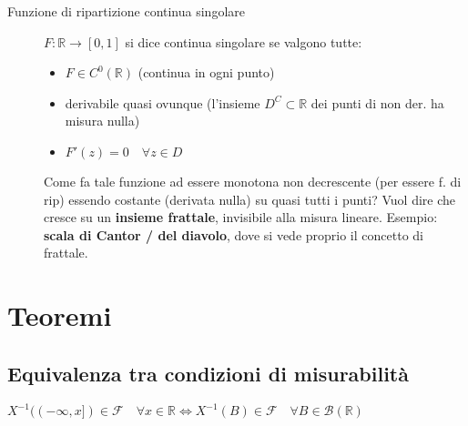 \documentclass[a4paper,10pt]{article}
\newcommand{\re}{\mathbb{R}} %
\theoremstyle{remark}
\theoremstyle{definition}
\begin{document}
\begin{description}
\item[Funzione di ripartizione continua singolare] $F:\re\to[0,1]$ si dice continua singolare se valgono tutte:
\begin{itemize}
    \item $F\in C^0(\re)$ (continua in ogni punto)
    \item derivabile quasi ovunque (l'insieme $D^C\subset \re$ dei punti di non der. ha misura nulla)
    \item $F'(z)=0 \quad \forall z\in D$
\end{itemize}
Come fa tale funzione ad essere monotona non decrescente (per essere f. di rip) essendo costante (derivata nulla) su quasi tutti i punti? Vuol dire che cresce su un \textbf{insieme frattale}, invisibile alla misura lineare. Esempio: \textbf{scala di Cantor / del diavolo}, dove si vede proprio il concetto di frattale.


\end{description}

\section*{Teoremi}
\subsection*{Equivalenza tra condizioni di misurabilità}
$X^{-1}((-\infty,x]) \in \mathcal{F} \quad \forall x\in\mathbb{R} \iff X^{-1}(B)\in \mathcal{F} \quad \forall B\in\mathcal{B}(\re)$
\end{document}
